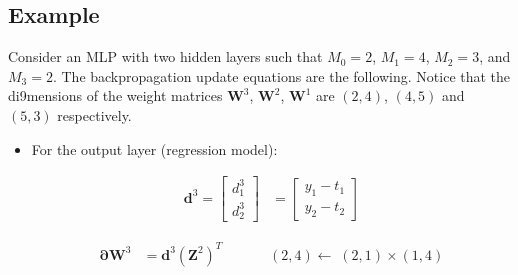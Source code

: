 \documentclass{tufte-handout}
\begin{document}
\subsection{Example}

Consider an MLP with two hidden layers such that $M_0=2$, $M_1=4$, $M_2=3$, and $M_3=2$. 
The backpropagation update equations are the following. Notice that the di9mensions of the weight
matrices $\mathbf W^3$, $\mathbf W^2$, $\mathbf W^1$ are  $(2,4)$,  $(4,5)$ and $(5,3)$ respectively.

\begin{itemize}

\item For the output layer (regression model):

\begin{align*}
\mathbf d^3 =
 \begin{bmatrix} 
d_1^3\\ d_2^3
\end{bmatrix} &= 
 \begin{bmatrix} 
y_1-t_1\\ y_2-t_2 
\end{bmatrix}
\end{align*}

\begin{align*}
\mathbf \partial \mathbf W^3 
&= \mathbf d^3  (\mathbf Z^2)^T  \;\;\;\;\;\;\;\;\;\;\;\; (2,4) \leftarrow \; (2,1) \times (1,4) \\
 \end{align*}


\end{itemize}
\end{document}

